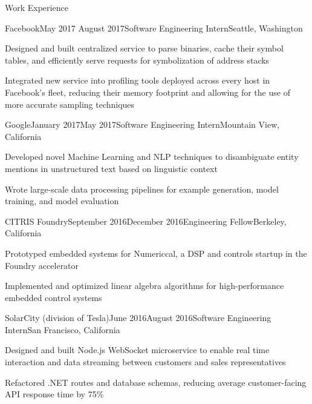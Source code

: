 \documentclass{resume} %
\begin{document}
\begin{rSection}{Work Experience}
\begin{rSubsection}{Facebook}{May 2017 \textminus August 2017}{Software Engineering Intern}{Seattle, Washington}
\item[] Designed and built centralized service to parse binaries, cache their symbol tables, and efficiently serve requests for symbolization of address stacks
\item[] Integrated new service into profiling tools deployed across every host in Facebook's fleet, reducing their memory footprint and allowing for the use of more accurate sampling techniques
\end{rSubsection}
\begin{rSubsection}{Google}{January 2017\textminus May 2017}{Software Engineering Intern}{Mountain View, California}
\item[] Developed novel Machine Learning and NLP techniques to disambiguate entity mentions in unstructured text based on linguistic context
\item[] Wrote large-scale data processing pipelines for example generation, model training, and model evaluation
\end{rSubsection}
\begin{rSubsection}{CITRIS Foundry}{September 2016\textminus December 2016}{Engineering Fellow}{Berkeley, California}
\item[] Prototyped embedded systems for Numericcal, a DSP and controls startup in the Foundry accelerator
\item[] Implemented and optimized linear algebra algorithms for high-performance embedded control systems
\end{rSubsection}
\begin{rSubsection}{SolarCity (division of Tesla)}{June 2016\textminus August 2016}{Software Engineering Intern}{San Francisco, California}
\item[] Designed and built Node.js WebSocket microservice to enable real time interaction and data streaming between customers and sales representatives
\item[] Refactored .NET routes and database schemas, reducing average customer-facing API response time by 75\%
\end{rSubsection}
\end{rSection}
\end{document}
